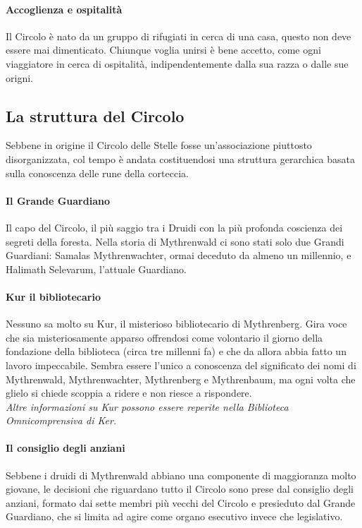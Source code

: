 \paragraph{Accoglienza e ospitalità} Il Circolo è nato da un gruppo di rifugiati in cerca di una casa, questo non deve essere mai dimenticato. Chiunque voglia unirsi è bene accetto, come ogni viaggiatore in cerca di ospitalità, indipendentemente dalla sua razza o dalle sue origni.

\subsection{La struttura del Circolo}

Sebbene in origine il Circolo delle Stelle fosse un'associazione piuttosto disorganizzata, col tempo è andata costituendosi una struttura gerarchica basata sulla conoscenza delle rune della corteccia.

\paragraph{Il Grande Guardiano} Il capo del Circolo, il più saggio tra i Druidi con la più profonda coscienza dei segreti della foresta. Nella storia di Mythrenwald ci sono stati solo due Grandi Guardiani: Samalas Mythrenwachter, ormai deceduto da almeno un millennio, e Halimath Selevarum, l'attuale Guardiano.

\paragraph{Kur il bibliotecario} Nessuno sa molto su Kur, il misterioso bibliotecario di Mythrenberg. Gira voce che sia misteriosamente apparso offrendosi come volontario il giorno della fondazione della biblioteca (circa tre millenni fa) e che da allora abbia fatto un lavoro impeccabile. Sembra essere l'unico a conoscenza del significato dei nomi di Mythrenwald, Mythrenwachter, Mythrenberg e Mythrenbaum, ma ogni volta che glielo si chiede scoppia a ridere e non riesce a rispondere. \\ \textit{Altre informazioni su Kur possono essere reperite nella Biblioteca Omnicomprensiva di Ker.}

\paragraph{Il consiglio degli anziani} Sebbene i druidi di Mythrenwald abbiano una componente di maggioranza molto giovane, le decisioni che riguardano tutto il Circolo sono prese dal consiglio degli anziani, formato dai sette membri più vecchi del Circolo e presieduto dal Grande Guardiano, che si limita ad agire come organo esecutivo invece che legislativo.


